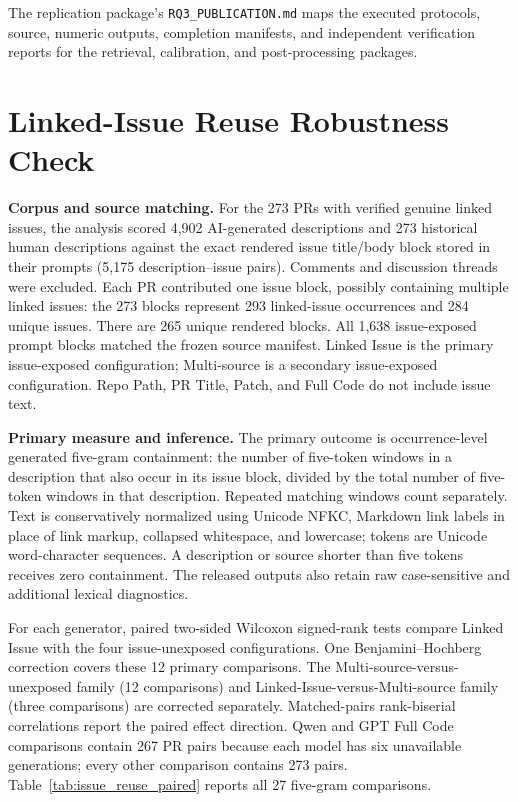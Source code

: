 \documentclass[11pt,a4paper]{article}
\begin{document}
The replication package's \texttt{RQ3\_PUBLICATION.md} maps the executed protocols, source, numeric outputs, completion manifests, and independent verification reports for the retrieval, calibration, and post-processing packages.

\FloatBarrier

\section{Linked-Issue Reuse Robustness Check}
\label{sec:linked_issue_reuse}

\textbf{Corpus and source matching.}
For the 273 PRs with verified genuine linked issues, the analysis scored 4,902 AI-generated descriptions and 273 historical human descriptions against the exact rendered issue title/body block stored in their prompts (5,175 description--issue pairs). Comments and discussion threads were excluded. Each PR contributed one issue block, possibly containing multiple linked issues: the 273 blocks represent 293 linked-issue occurrences and 284 unique issues. There are 265 unique rendered blocks. All 1,638 issue-exposed prompt blocks matched the frozen source manifest. Linked Issue is the primary issue-exposed configuration; Multi-source is a secondary issue-exposed configuration. Repo Path, PR Title, Patch, and Full Code do not include issue text.

\textbf{Primary measure and inference.}
The primary outcome is occurrence-level generated five-gram containment: the number of five-token windows in a description that also occur in its issue block, divided by the total number of five-token windows in that description. Repeated matching windows count separately. Text is conservatively normalized using Unicode NFKC, Markdown link labels in place of link markup, collapsed whitespace, and lowercase; tokens are Unicode word-character sequences. A description or source shorter than five tokens receives zero containment. The released outputs also retain raw case-sensitive and additional lexical diagnostics.

For each generator, paired two-sided Wilcoxon signed-rank tests compare Linked Issue with the four issue-unexposed configurations. One Benjamini--Hochberg correction covers these 12 primary comparisons. The Multi-source-versus-unexposed family (12 comparisons) and Linked-Issue-versus-Multi-source family (three comparisons) are corrected separately. Matched-pairs rank-biserial correlations report the paired effect direction. Qwen and GPT Full Code comparisons contain 267 PR pairs because each model has six unavailable generations; every other comparison contains 273 pairs. Table~\ref{tab:issue_reuse_paired} reports all 27 five-gram comparisons.
\end{document}
